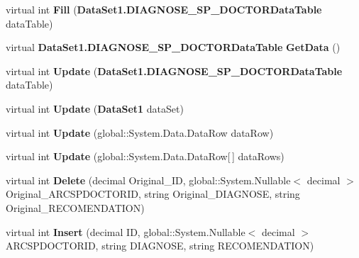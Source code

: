 \begin{CompactItemize}
\item 
virtual int \textbf{Fill} ({\bf DataSet1.DIAGNOSE\_\-SP\_\-DOCTORDataTable} dataTable)\label{class_automatic_medical_system_1_1_data_set1_table_adapters_1_1_d_i_a_g_n_o_s_e___s_p___d_o_c_t_o_r_table_adapter_be4a63eb6be4e30cd91640c5b3f291be}

\item 
virtual {\bf DataSet1.DIAGNOSE\_\-SP\_\-DOCTORDataTable} \textbf{GetData} ()\label{class_automatic_medical_system_1_1_data_set1_table_adapters_1_1_d_i_a_g_n_o_s_e___s_p___d_o_c_t_o_r_table_adapter_ec74a6c9312e4155fe76628b1282b3bb}

\item 
virtual int \textbf{Update} ({\bf DataSet1.DIAGNOSE\_\-SP\_\-DOCTORDataTable} dataTable)\label{class_automatic_medical_system_1_1_data_set1_table_adapters_1_1_d_i_a_g_n_o_s_e___s_p___d_o_c_t_o_r_table_adapter_d0cbf3cb8b612bf0c10cc1ec9b40219d}

\item 
virtual int \textbf{Update} ({\bf DataSet1} dataSet)\label{class_automatic_medical_system_1_1_data_set1_table_adapters_1_1_d_i_a_g_n_o_s_e___s_p___d_o_c_t_o_r_table_adapter_12fec7bcc92d4468aa3f20746de1ea47}

\item 
virtual int \textbf{Update} (global::System.Data.DataRow dataRow)\label{class_automatic_medical_system_1_1_data_set1_table_adapters_1_1_d_i_a_g_n_o_s_e___s_p___d_o_c_t_o_r_table_adapter_3174ddf60a2d4c42125a36710cdec7d9}

\item 
virtual int \textbf{Update} (global::System.Data.DataRow[$\,$] dataRows)\label{class_automatic_medical_system_1_1_data_set1_table_adapters_1_1_d_i_a_g_n_o_s_e___s_p___d_o_c_t_o_r_table_adapter_8f805523e3d73e477cab83cc02a18f4d}

\item 
virtual int \textbf{Delete} (decimal Original\_\-ID, global::System.Nullable$<$ decimal $>$ Original\_\-ARCSPDOCTORID, string Original\_\-DIAGNOSE, string Original\_\-RECOMENDATION)\label{class_automatic_medical_system_1_1_data_set1_table_adapters_1_1_d_i_a_g_n_o_s_e___s_p___d_o_c_t_o_r_table_adapter_843393946536af6a58402ba0e63938a4}

\item 
virtual int \textbf{Insert} (decimal ID, global::System.Nullable$<$ decimal $>$ ARCSPDOCTORID, string DIAGNOSE, string RECOMENDATION)\label{class_automatic_medical_system_1_1_data_set1_table_adapters_1_1_d_i_a_g_n_o_s_e___s_p___d_o_c_t_o_r_table_adapter_6f0b7251640f2be8cbd46061020d4c75}


\end{CompactItemize}
